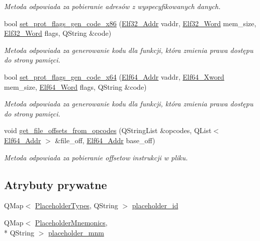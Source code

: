 \begin{DoxyCompactItemize}
\begin{DoxyCompactList}\small\item\em Metoda odpowiada za pobieranie adresów z wyspecyfikowanych danych. \end{DoxyCompactList}\item 
bool \hyperlink{class_e_l_f_adding_methods_a2366eabcf1be00baed6d4e652c70cd99}{set\-\_\-prot\-\_\-flags\-\_\-gen\-\_\-code\-\_\-x86} (\hyperlink{elf_8h_a40c6d4571e6001f443cc6a6474620158}{Elf32\-\_\-\-Addr} vaddr, \hyperlink{elf_8h_af5924ece606c732e86f8263a19408e45}{Elf32\-\_\-\-Word} mem\-\_\-size, \hyperlink{elf_8h_af5924ece606c732e86f8263a19408e45}{Elf32\-\_\-\-Word} flags, Q\-String \&code)
\begin{DoxyCompactList}\small\item\em Metoda odpowiada za generowanie kodu dla funkcji, która zmienia prawa dostępu do strony pamięci. \end{DoxyCompactList}\item 
bool \hyperlink{class_e_l_f_adding_methods_ab5fee890e1e3e4ae015f328b12312275}{set\-\_\-prot\-\_\-flags\-\_\-gen\-\_\-code\-\_\-x64} (\hyperlink{elf_8h_aeed51d08e3a950d637f8ec1f0cd4ef65}{Elf64\-\_\-\-Addr} vaddr, \hyperlink{elf_8h_a5447a48a3dae0bd24f606415268c6fe4}{Elf64\-\_\-\-Xword} mem\-\_\-size, \hyperlink{elf_8h_aa3aa1920ed115b7ef7e99716fece4401}{Elf64\-\_\-\-Word} flags, Q\-String \&code)
\begin{DoxyCompactList}\small\item\em Metoda odpowiada za generowanie kodu dla funkcji, która zmienia prawa dostępu do strony pamięci. \end{DoxyCompactList}\item 
void \hyperlink{class_e_l_f_adding_methods_a2f92b80d3e5470890c1d78cb8575c13d}{get\-\_\-file\-\_\-offsets\-\_\-from\-\_\-opcodes} (Q\-String\-List \&opcodes, Q\-List$<$ \hyperlink{elf_8h_aeed51d08e3a950d637f8ec1f0cd4ef65}{Elf64\-\_\-\-Addr} $>$ \&file\-\_\-off, \hyperlink{elf_8h_aeed51d08e3a950d637f8ec1f0cd4ef65}{Elf64\-\_\-\-Addr} base\-\_\-off)
\begin{DoxyCompactList}\small\item\em Metoda odpowiada za pobieranie offsetow instrukcji w pliku. \end{DoxyCompactList}\end{DoxyCompactItemize}
\subsection*{Atrybuty prywatne}
\begin{DoxyCompactItemize}
\item 
Q\-Map$<$ \hyperlink{class_e_l_f_adding_methods_a7058ae8ed3ce82783edb1eb0a44c1150}{Placeholder\-Types}, Q\-String $>$ \hyperlink{class_e_l_f_adding_methods_a108205cdbf268927f0b64c2a783a96d5}{placeholder\-\_\-id}
\item 
Q\-Map$<$ \hyperlink{class_e_l_f_adding_methods_a666b28eeb9569323a4f697d37c6a1022}{Placeholder\-Mnemonics}, \\*
Q\-String $>$ \hyperlink{class_e_l_f_adding_methods_ad77df886acfad79f1b705f5ff1976e4a}{placeholder\-\_\-mnm}
\end{DoxyCompactItemize}
